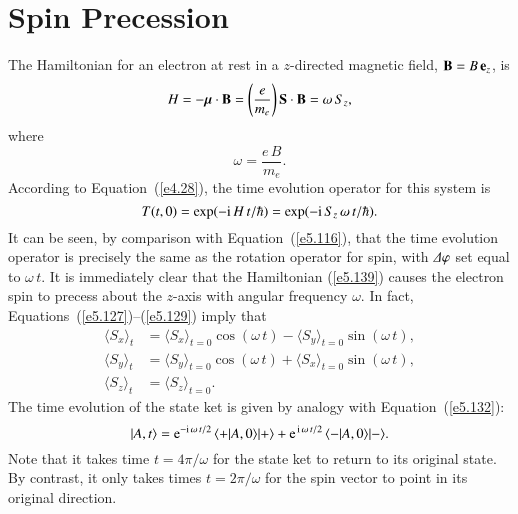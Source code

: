 \section{Spin Precession}
The Hamiltonian for an electron at rest in a $z$-directed  magnetic field, ${\bf B}=
B\,{\bf e}_z$,
is
\begin{equation}\label{e5.139}
H = - \mbox{\boldmath$\mu$} \cdot {\bf B} = \left(\frac{e}{m_e}\right) {\bf S} \cdot {\bf B}
= \omega\, S_z,
\end{equation}
where
\begin{equation}\label{e5.140}
\omega = \frac{e\,B}{m_e}.
\end{equation}
According to Equation~(\ref{e4.28}), the time evolution operator for this system is
\begin{equation}
T(t,0) = \exp(-{\rm i} \,H\, t/\hbar) = \exp(-{\rm i} \,S_z\, \omega\, t/\hbar).
\end{equation}
It can be seen, by comparison with Equation~(\ref{e5.116}), that the time evolution operator
is precisely the same as the rotation operator for spin, with ${\mit\Delta}\varphi$ set
equal to $\omega \,t$. It is immediately clear that the Hamiltonian (\ref{e5.139})
 causes the electron 
spin to precess about the $z$-axis with angular frequency $\omega$. In fact,
Equations~(\ref{e5.127})--(\ref{e5.129}) imply  that
\begin{align}
\langle S_x\rangle_t &= \langle S_x\rangle_{t=0} \cos(\omega \,t) - 
\langle S_y\rangle_{t=0} \sin(\omega\, t),\\[0.5ex]
\langle S_y\rangle_t &= \langle S_y\rangle_{t=0} \cos(\omega\, t) +
\langle S_x\rangle_{t=0} \sin(\omega\, t),\\[0.5ex]
\langle S_z\rangle_t&= \langle S_z\rangle_{t=0}.
\end{align}
The time evolution of the state ket is given by analogy with Equation~(\ref{e5.132}):
\begin{equation}
|A, t\rangle = {\rm e}^{-{\rm i}\,\omega \,t/2}\,
\langle +|A, 0\rangle |+\rangle +  {\rm e}^{\,{\rm i}\,\omega \,t/2}\,
\langle -|A, 0\rangle |-\rangle.
\end{equation}
Note that it takes time $t= 4\pi/\omega$ for the state ket to return  to its
original state. 
By contrast, it only takes times $t=2\pi/\omega$ for the spin vector to point
in its original direction. 

